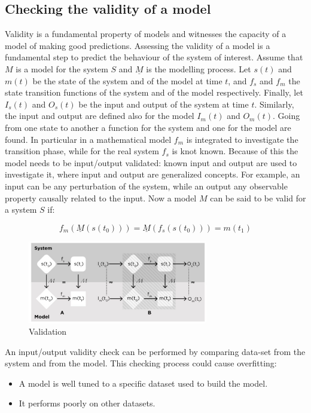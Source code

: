   \subsection{Checking the validity of a model}
  Validity is a fundamental property of models and witnesses the capacity of a model of making good predictions.
  Assessing the validity of a model is a fundamental step to predict the behaviour of the system of interest.
  Assume that $M$ is a model for the system $S$ and $\underline{M}$ is the modelling process.
  Let $s(t)$ and $m(t)$ be the state of the system and of the model at time $t$, and $f_s$ and $f_m$ the state transition functions of the system and of the model respectively.
  Finally, let $I_s(t)$ and $O_s(t)$ be the input and output of the system at time $t$.
  Similarly, the input and output are defined also for the model $I_m(t)$ and $O_m(t)$.
  Going from one state to another a function for the system and one for the model are found.
  In particular in a mathematical model $f_m$ is integrated to investigate the transition phase, while for the real system $f_s$ is knot known.
  Because of this the model needs to be input/output validated: known input and output are used to investigate it, where input and output are generalized concepts.
  For example, an input can be any perturbation of the system, while an output any observable property causally related to the input.
  Now a model $M$ can be said to be valid for a system $S$ if:

  $$f_m(\underline{M}(s(t_0))) = \underline{M}(f_s(s(t_0))) = m(t_1)$$

  \begin{figure}[H]
    \centering
    \includegraphics[width=0.7\textwidth]{validation.png}
    \caption{Validation}
    \end{figure}
  \noindent

  An input/output validity check can be performed by comparing data-set from the system and from the model.
  This checking process could cause overfitting:

  \begin{multicols}{2}
    \begin{itemize}
      \item A model is well tuned to a specific dataset used to build the model.
      \item It performs poorly on other datasets.
    \end{itemize}
  \end{multicols}

